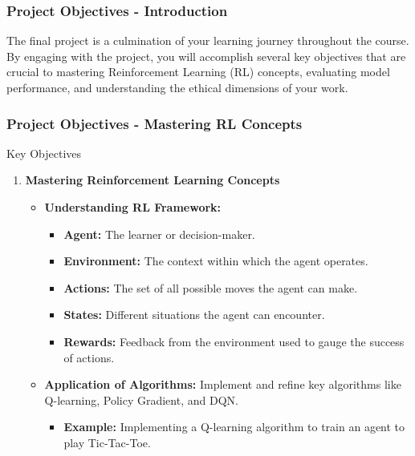 \documentclass[aspectratio=169]{beamer}
\begin{document}
\begin{frame}[fragile]
    \frametitle{Project Objectives - Introduction}
    The final project is a culmination of your learning journey throughout the course. By engaging with the project, you will accomplish several key objectives that are crucial to mastering Reinforcement Learning (RL) concepts, evaluating model performance, and understanding the ethical dimensions of your work.
\end{frame}

\begin{frame}[fragile]
    \frametitle{Project Objectives - Mastering RL Concepts}
    \begin{block}{Key Objectives}
        \begin{enumerate}
            \item \textbf{Mastering Reinforcement Learning Concepts}
            \begin{itemize}
                \item \textbf{Understanding RL Framework:}
                \begin{itemize}
                    \item \textbf{Agent:} The learner or decision-maker.
                    \item \textbf{Environment:} The context within which the agent operates.
                    \item \textbf{Actions:} The set of all possible moves the agent can make.
                    \item \textbf{States:} Different situations the agent can encounter.
                    \item \textbf{Rewards:} Feedback from the environment used to gauge the success of actions.
                \end{itemize}
                \item \textbf{Application of Algorithms:} Implement and refine key algorithms like Q-learning, Policy Gradient, and DQN.
                \begin{itemize}
                    \item \textbf{Example:} Implementing a Q-learning algorithm to train an agent to play Tic-Tac-Toe.
                \end{itemize}
            \end{itemize}
        \end{enumerate}
    \end{block}
\end{frame}
\end{document}
